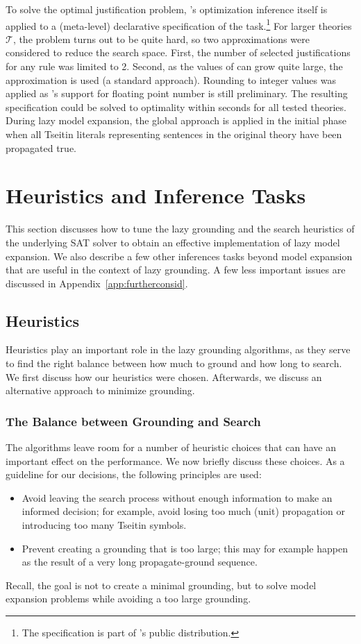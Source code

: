\documentclass[11pt]{article}
\newcommand{\m}[1]{\ensuremath{#1}\xspace}
\newcommand{\theory}{\m{\mathcal{T}}}
\newcommand{\logicname}[1]{\text{\sc #1}\xspace}
\newcommand{\idp}{\logicname{IDP}}
\theoremstyle{plain}
\theoremstyle{definition}
\theoremstyle{example_basic}
\theoremstyle{example_contd}
\theoremstyle{plain}
\newcommand{\change}[1]{#1}
\begin{document}
To solve the optimal justification problem, \idp's optimization inference itself is applied to a (meta-level) declarative specification of the task.\footnote{The specification is part of \idp's public distribution.} For larger theories \theory, the problem turns out to be quite hard, so two approximations were considered to reduce the search space. First, the number of selected justifications for any rule was limited to 2. Second, as the values of  can grow quite large, the approximation  is used (a standard approach). \change{Rounding to integer values was applied as \idp's support for floating point number is still preliminary.} The resulting specification could be solved to optimality within seconds for all tested theories. 
During lazy model expansion, the global approach is applied in the initial phase when all Tseitin literals representing sentences in the original theory have been propagated true.

\section{Heuristics and Inference Tasks}\label{sec:optimizations}
\change{This section discusses how to tune the lazy grounding and the
  search heuristics of the underlying SAT solver to obtain an
  effective implementation of lazy model expansion. We also describe a
  few other inferences tasks beyond model expansion that are useful in
  the context of lazy grounding. A few less important issues are discussed in Appendix~\ref{app:furtherconsid}. }

\subsection{Heuristics}\label{ssec:heur}
Heuristics play an important role in the lazy grounding algorithms, as they serve to find the right balance between how much to ground and how long to search. We first discuss how our heuristics were chosen. Afterwards, we discuss an alternative approach to minimize  grounding.

\subsubsection{The Balance between Grounding and Search}
The algorithms leave room for a number of heuristic choices that can have an important effect on the performance. We now briefly discuss these choices. As a guideline for our decisions, the following principles are used:
\begin{itemize}
  \item Avoid leaving the search process without enough information to make an informed decision; for example, avoid losing too much (unit) propagation or introducing too many Tseitin symbols.
  \item Prevent creating a grounding that is too large; this may for example happen as the result of a very long propagate-ground sequence.
\end{itemize}
Recall, the goal is not to create a minimal grounding, but to solve model expansion problems while avoiding a too large grounding.
\end{document}
